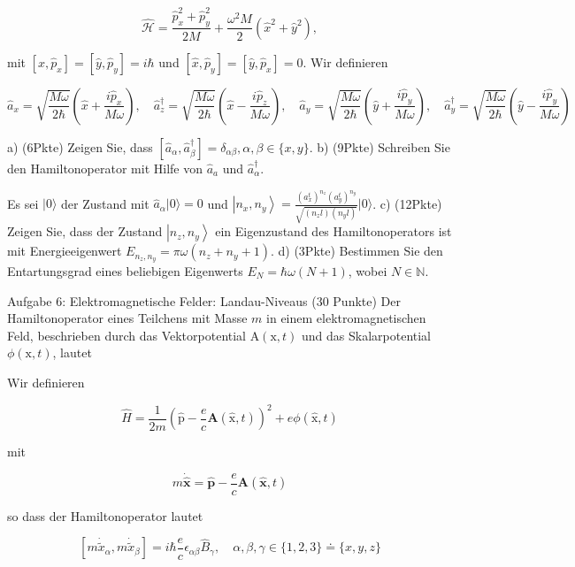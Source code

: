 \documentclass[11pt,a4paper]{article}
\begin{document}
$$
\hat{\mathcal{H}}=\frac{\hat{p}_x^2+\hat{p}_y^2}{2 M}+\frac{\omega^2 M}{2}\left(\hat{x}^2+\hat{y}^2\right),
$$

mit $\left[\hat{x}, \hat{p}_x\right]=\left[\hat{y}, \hat{p}_y\right]=i \hbar$ und $\left[\hat{x}, \hat{p}_y\right]=\left[\hat{y}, \hat{p}_x\right]=0$. Wir definieren

$$
\hat{a}_x=\sqrt{\frac{M \omega}{2 \hbar}}\left(\hat{x}+\frac{i \hat{p}_x}{M \omega}\right), \quad \hat{a}{ }_z^{\dagger}=\sqrt{\frac{M \omega}{2 \hbar}}\left(\hat{x}-\frac{i \hat{p}_z}{M \omega}\right), \quad \hat{a}_y=\sqrt{\frac{M \omega}{2 \hbar}}\left(\hat{y}+\frac{i \hat{p}_y}{M \omega}\right), \quad \hat{a}_y^{\dagger}=\sqrt{\frac{M \omega}{2 \hbar}}\left(\hat{y}-\frac{i \hat{p}_y}{M \omega}\right)
$$

a) (6Pkte) Zeigen Sie, dass $\left[\hat{a}_\alpha, \hat{a}_\beta^{\dagger}\right]=\delta_{\alpha \beta}, \alpha, \beta \in\{x, y\}$.
b) (9Pkte) Schreiben Sie den Hamiltonoperator mit Hilfe von $\hat{a}_a$ und $\hat{a}_\alpha^{\dagger}$.

Es sei $|0\rangle$ der Zustand mit $\hat{a}_\alpha|0\rangle=0$ und $\left|n_x, n_y\right\rangle=\frac{\left(a_x^t\right)^{n_z}\left(a_y^t\right)^{n_y}}{\sqrt{\left(n_z l\right)\left(n_y l\right)}}|0\rangle$.
c) (12Pkte) Zeigen Sie, dass der Zustand $\left|n_z, n_y\right\rangle$ ein Eigenzustand des Hamiltonoperators ist mit Energieeigenwert $E_{n_z, n_y}=\pi \omega\left(n_z+n_y+1\right)$.
d) (3Pkte) Bestimmen Sie den Entartungsgrad eines beliebigen Eigenwerts $E_N=\hbar \omega(N+1)$, wobei $N \in \mathbb{N}$.






Aufgabe 6: Elektromagnetische Felder: Landau-Niveaus (30 Punkte)
Der Hamiltonoperator eines Teilchens mit Masse $m$ in einem elektromagnetischen Feld, beschrieben durch das Vektorpotential $\mathrm{A}(\mathrm{x}, t)$ und das Skalarpotential $\phi(\mathrm{x}, t)$, lautet

Wir definieren

$$
\hat{H}=\frac{1}{2 m}\left(\hat{\mathrm{p}}-\frac{e}{c} \mathbf{A}(\hat{\mathrm{x}}, t)\right)^2+e \phi(\hat{\mathrm{x}}, t)
$$

mit

$$
m \dot{\hat{\mathbf{x}}}=\hat{\mathbf{p}}-\frac{e}{c} \boldsymbol{A}(\hat{\mathbf{x}}, t)
$$

so dass der Hamiltonoperator lautet

$$
\left[m \dot{\tilde{x}}_\alpha, m \dot{\tilde{x}}_\beta\right]=i \hbar \frac{e}{c} \epsilon_{\alpha \beta} \hat{B}_\gamma, \quad \alpha, \beta, \gamma \in\{1,2,3\} \doteq\{x, y, z\}
$$
\end{document}
